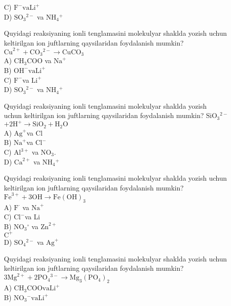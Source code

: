 C) $\mathrm{F}^{-} \mathrm{va} \mathrm{Li}^{+}$\\
D) $\mathrm{SO}_{3}{ }^{2-}$ va $\mathrm{NH}_{4}{ }^{+}$
  \item Quyidagi reaksiyaning ionli tenglamasini molekulyar shaklda yozish uchun keltirilgan ion juftlarning qaysilaridan foydalanish mumkin? $\mathrm{Cu}^{2+}+\mathrm{CO}_{3}{ }^{2-} \rightarrow \mathrm{CuCO}_{3}$\\
A) $\mathrm{CH}_{3} \mathrm{COO}$ va $\mathrm{Na}^{+}$\\
B) $\mathrm{OH}^{-} \mathrm{va} \mathrm{Li}^{+}$\\
C) $\mathrm{F}^{-}$va $\mathrm{Li}^{+}$\\
D) $\mathrm{SO}_{3}{ }^{2-}$ va $\mathrm{NH}_{4}{ }^{+}$
  \item Quyidagi reaksiyaning ionli tenglamasini molekulyar shaklda yozish\\
uchun keltirilgan ion juftlarning qaysilaridan foydalanish mumkin? $\mathrm{SiO}_{3}{ }^{2-}$ $+2 \mathrm{H}^{+} \rightarrow \mathrm{SiO}_{2}+\mathrm{H}_{2} \mathrm{O}$\\
A) $\mathrm{Ag}^{+}$va Cl\\
B) $\mathrm{Na}^{+}$va $\mathrm{Cl}^{-}$\\
C) $\mathrm{Al}^{3+}$ va $\mathrm{NO}_{3}$.\\
D) $\mathrm{Ca}^{2+}$ va $\mathrm{NH}_{4}{ }^{+}$
  \item Quyidagi reaksiyaning ionli tenglamasini molekulyar shaklda yozish uchun keltirilgan ion juftlarning qaysilaridan foydalanish mumkin? $\mathrm{Fe}^{3+}+3 \mathrm{OH} \rightarrow \mathrm{Fe}(\mathrm{OH})_{3}$\\
A) $\mathrm{F}^{\cdot}$ va $\mathrm{Na}^{+}$\\
C) $\mathrm{Cl}^{-}$va Li\\
B) $\mathrm{NO}_{3}{ }^{\circ}$ va $\mathrm{Zn}^{2+}$\\
$\mathrm{C}^{+}$\\
D) $\mathrm{SO}_{4}{ }^{2-}$ va $\mathrm{Ag}^{+}$
  \item Quyidagi reaksiyaning ionli tenglamasini molekulyar shaklda yozish uchun keltirilgan ion juftlarning qaysilaridan foydalanish mumkin? $3 \mathrm{Mg}^{2+}+2 \mathrm{PO}_{4}{ }^{3-} \rightarrow \mathrm{Mg}_{3}\left(\mathrm{PO}_{4}\right)_{2}$\\
A) $\mathrm{CH}_{3} \mathrm{COO} \mathrm{va} \mathrm{Li}^{+}$\\
B) $\mathrm{NO}_{3}{ }^{-} \mathrm{va} \mathrm{Li}^{+}$\\
